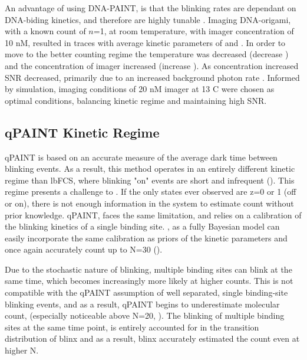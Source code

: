 An advantage of using DNA-PAINT, is that the blinking rates are dependant on DNA-biding kinetics,
	and therefore are highly tunable \cite{wade_2019, strauss_2020}. %
	Imaging DNA-origami, with a known count of $n$=1, at room temperature, with imager concentration of 10 nM, 
	resulted in traces with average kinetic parameters of  and  . 
	In order to move to the better counting regime the temperature was decreased (decrease \poff) 
	and the concentration of imager increased (increase \pon).
	As concentration increased SNR decreased, primarily due to an increased background photon rate \rb.
	Informed by simulation, imaging conditions of 20 nM imager at 13 C were chosen as optimal conditions,
	balancing kinetic regime and maintaining high SNR.



\subsection{qPAINT Kinetic Regime}
qPAINT is based on an accurate measure of the average dark time between blinking events. 
	As a result, this method operates in an entirely different kinetic regime than lbFCS, where blinking 
	"on" events are short and infrequent ().
	This regime presents a challenge to \ours. If the only states ever observed are z=0 or 1 (off or on),
	there is not enough information in the system to estimate count without prior knowledge.
	qPAINT, faces the same limitation, and relies on a calibration of the blinking kinetics of a single binding site.
	\ours, as a fully Bayesian model can easily incorporate the same calibration as priors of the kinetic parameters
	and once again accurately count up to N=30 ().

Due to the stochastic nature of blinking, multiple binding sites can blink at the same time, 
	which becomes increasingly more likely at higher counts.
	This is not compatible with the qPAINT assumption of well separated, single binding-site blinking events, 
	and as a result, qPAINT begins to underestimate molecular count, (especially noticeable above N=20, ). 
	The blinking of multiple binding sites at the same time point, 
	is entirely accounted for in the transition distribution of blinx 
	and as a result, blinx accurately estimated the count even at higher N.
	

